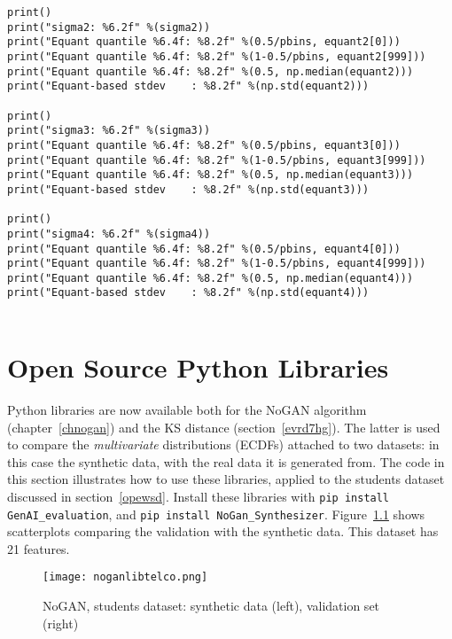 \documentclass[oneside,10pt]{book}
\begin{document}
\begin{lstlisting}
print()
print("sigma2: %6.2f" %(sigma2))
print("Equant quantile %6.4f: %8.2f" %(0.5/pbins, equant2[0]))
print("Equant quantile %6.4f: %8.2f" %(1-0.5/pbins, equant2[999]))
print("Equant quantile %6.4f: %8.2f" %(0.5, np.median(equant2)))
print("Equant-based stdev    : %8.2f" %(np.std(equant2)))

print()
print("sigma3: %6.2f" %(sigma3))
print("Equant quantile %6.4f: %8.2f" %(0.5/pbins, equant3[0]))
print("Equant quantile %6.4f: %8.2f" %(1-0.5/pbins, equant3[999]))
print("Equant quantile %6.4f: %8.2f" %(0.5, np.median(equant3)))
print("Equant-based stdev    : %8.2f" %(np.std(equant3)))

print()
print("sigma4: %6.2f" %(sigma4))
print("Equant quantile %6.4f: %8.2f" %(0.5/pbins, equant4[0]))
print("Equant quantile %6.4f: %8.2f" %(1-0.5/pbins, equant4[999]))
print("Equant quantile %6.4f: %8.2f" %(0.5, np.median(equant4)))
print("Equant-based stdev    : %8.2f" %(np.std(equant4)))


\end{lstlisting}


\appendix

\chapter{Open Source Python Libraries}\label{aasdattt}

Python libraries are now available both for the NoGAN algorithm (chapter~\ref{chnogan})
 and the KS distance (section~\ref{evrd7hg}).
 The latter is used to compare the {\em multivariate} distributions (ECDFs) attached to two datasets: in this case the synthetic data, with the real data
  it is generated from. The code in this section illustrates how to use these libraries, applied to the students dataset discussed in section~\ref{opewsd}.
 Install these libraries with \texttt{pip install GenAI\_evaluation}, and \texttt{pip install NoGan\_Synthesizer}. Figure~\ref{fig:pi3qawty2xsuuvc} shows
 scatterplots comparing the validation with the synthetic data. This dataset has 21 features.



\begin{figure}[H]
\centering
\texttt{[image: noganlibtelco.png]}
\caption{NoGAN, students dataset: synthetic data (left), validation set (right)}
\label{fig:pi3qawty2xsuuvc}
\end{figure}
\end{document}
